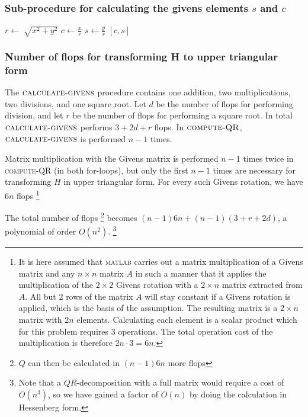 \subsubsection*{Sub-procedure for calculating the givens elements $s$ and $c$}
\begin{algorithmic}
\State $r \gets \sqrt[]{x^2+y^2 }$ 
\State $c \gets \frac{x}{r} $
\State $s \gets \frac{y}{r} $
\State \Return $[c, s]$
\EndFunction
\end{algorithmic}

\subsubsection*{Number of flops for transforming H to upper triangular form}
The $\textsc{calculate-givens}$ procedure contains one addition, two multiplications, two divisions, and one square root. 
Let $d$ be the number of flops for performing division, and let $r$ be the number of flops for performing a square root. 
In total $\textsc{calculate-givens}$ performs $3+2d+r$ flops. In $\textsc{compute-QR}$, $\textsc{calculate-givens}$ is performed $n-1$ times. 

Matrix multiplication with the Givens matrix is performed $n-1$ times twice in \textsc{compute-QR} (in both for-loops), but only the first $n-1$ times are necessary for transforming $H$ in upper triangular form. 
For every such Givens rotation, we have $6n$ flops \footnote{
It is here assumed that \textsc{matlab} carries out a matrix multiplication of a Givens matrix and any $n \times n$ matrix $A$ in such a manner that it applies the multiplication of the $2\times2$ Givens rotation with a $2\times n$ matrix extracted from $A$. 
All but 2 rows of the matrix $A$ will stay constant if a Givens rotation is applied, which is the basis of the assumption. 
The resulting matrix is a $2\times n$ matrix with $2n$ elements. 
Calculating each element is a scalar product which for this problem requires 3 operations. 
The total operation cost of the multiplication is therefore $2n\cdot 3=6n$. }

The total number of flops \footnote{$Q$ can then be calculated in $(n-1)6n$ more flops} becomes $(n-1)6n+(n-1)(3+r+2d)$, a polynomial of order $O(n^2)$. \footnote{Note that a $QR$-decomposition with a full matrix would require a cost of $O(n^3)$, so we have gained a factor of $O(n)$ by doing the calculation in Hessenberg form.}

